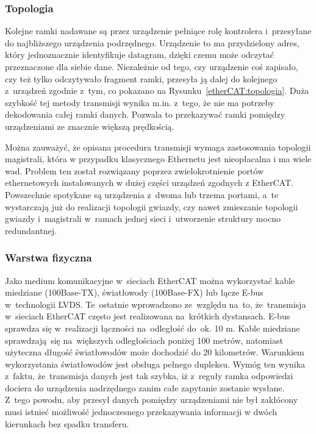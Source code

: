 \subsubsection{Topologia}
Kolejne ramki nadawane są przez urządzenie pełniące rolę kontrolera i~przesyłane do najbliższego urządzenia podrzędnego. Urządzenie to ma przydzielony adres, który jednoznacznie identyfikuje datagram, dzięki czemu może odczytać przeznaczone dla siebie dane. Niezależnie od tego, czy urządzenie coś zapisało, czy też tylko odczytywało fragment ramki, przesyła ją dalej do kolejnego z~urządzeń zgodnie z~tym, co pokazano na Rysunku~\ref{etherCAT:topologia}. Duża szybkość tej metody transmisji wynika m.in. z~tego, że nie ma potrzeby dekodowania całej ramki danych. Pozwala to przekazywać ramki pomiędzy urządzeniami ze znacznie większą prędkością.
\vspace{-3mm}

Można zauważyć, że opisana procedura transmisji wymaga zastosowania topologii magistrali, która w przypadku klasycznego Ethernetu jest nieopłacalna i ma wiele wad. Problem ten został rozwiązany poprzez zwielokrotnienie portów ethernetowych instalowanych w dużej części urządzeń zgodnych z EtherCAT.
Powszechnie spotykane są urządzenia z~dwoma lub trzema portami, a~te wystarczają już do realizacji topologii gwiazdy, czy nawet zmieszanie topologii gwiazdy i~magistrali w~ramach jednej sieci i~utworzenie struktury mocno redundantnej.

\subsubsection{Warstwa fizyczna}
Jako medium komunikacyjne w~sieciach EtherCAT można wykorzystać kable miedziane (100Base-TX), światłowody (100Base-FX) lub łącze E-bus w~technologii LVDS. Te~ostatnie wprowadzono ze~względu na~to, że~transmisja w~sieciach EtherCAT często jest realizowana na~krótkich dystansach. E-bus sprawdza się w~realizacji łączności na~odległość do~ok. 10 m. Kable miedziane sprawdzają~się na~większych odległościach poniżej 100 metrów, natomiast użyteczna długość światłowodów może dochodzić do 20 kilometrów. Warunkiem wykorzystania światłowodów jest obsługa pełnego dupleksu. Wymóg ten wynika z~faktu, że~transmisja danych jest tak szybka, iż z~reguły ramka odpowiedzi dociera do urządzenia nadrzędnego zanim całe zapytanie zostanie wysłane. Z~tego powodu, aby przesył danych pomiędzy urządzeniami nie był zakłócony musi istnieć możliwość jednoczesnego przekazywania informacji w dwóch kierunkach bez spadku transferu.

